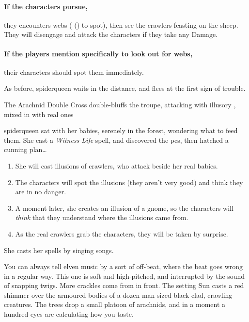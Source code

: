 \paragraph{If the characters pursue,}
they encounters webs ( (\tn[9]) to spot), then see the \glspl{crawler} feasting on the sheep.
They will disengage and attack the characters if they take any Damage.

\paragraph{If the players mention specifically to look out for webs,}
their characters should spot them immediately.

As before, \gls{spiderqueen} waits in the distance, and flees at the first sign of trouble.



{The Arachnid Double Cross}%
{ double-bluffs the troupe, attacking with illusory , mixed in with real ones}%
\label{spiderqueenssong}

\Gls{spiderqueen} sat with her babies, serenely in the forest, wondering what to feed them.
She cast a \textit{Witness Life} spell, and discovered the \glspl{pc}, then hatched a cunning plan\ldots

\begin{enumerate}
  \item
    She will cast illusions of \glspl{crawler}, who attack beside her real babies.
  \item
  The characters will spot the illusions (they aren't very good) and think they are in no danger.
  \item
  A moment later, she creates an illusion of a gnome, so the characters will \emph{think} that they understand where the illusions came from.
  \item
  As the real \glspl{crawler} grab the characters, they will be taken by surprise.
\end{enumerate}

She casts her \glspl{spell} by singing songs.

\begin{boxtext}
  You can always tell elven music by a sort of off-beat, where the beat goes wrong in a regular way.
  This one is soft and high-pitched, and interrupted by the sound of snapping twigs.
  More crackles come from in front.
  The setting Sun casts a red shimmer over the armoured bodies of a dozen man-sized black-clad, crawling creatures.
  The trees drop a small platoon of arachnids, and in a moment a hundred eyes are calculating how you taste.
\end{boxtext}

